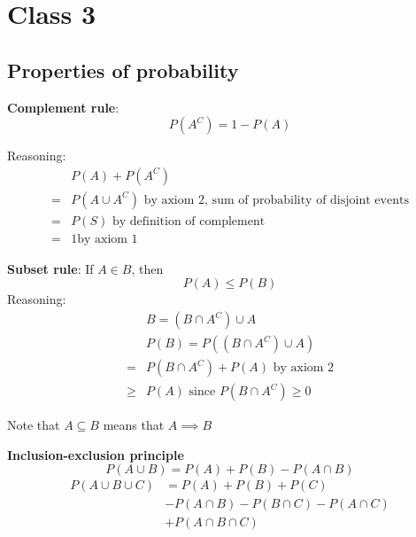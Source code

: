 \chapter{Class 3}

\section{Properties of probability}

\begin{framed}
   \textbf{Complement rule}: 
   \[
     P(A^C) = 1 - P(A)
   \] 

   Reasoning:
   \begin{align*}
      &P(A) + P(A^C) \\
      =& P(A \cup A^C) \text{ by axiom 2, sum of probability of disjoint events} \\
      =& P(S) \text{ by definition of complement} \\
      =& 1 \text{by axiom 1}
   \end{align*}
\end{framed}

\begin{framed}
   \textbf{Subset rule}: If $A \in B$, then
   \[
     P(A) \leq P(B)
   \] 
   Reasoning: 
   \begin{align*}
      & B = (B \cap A^C) \cup A \\
      &P(B) = P((B \cap A^C) \cup A) \\
      =& P(B \cap A^C) + P(A) \text{ by axiom 2} \\
      \geq& P(A) \text{ since $P(B \cap A^C) \geq 0$}
   \end{align*}
   
Note that $A \subseteq B$ means that $A \implies B$
\end{framed}

\begin{framed}
\textbf{Inclusion-exclusion principle}
\[
  P(A \cup B) = P(A) + P(B) - P(A \cap B)
\] 
\begin{align*}
   P(A \cup B \cup C) &= P(A) + P(B) + P(C)  \\
                      & - P(A \cap B) - P(B \cap C) - P(A \cap C) \\
                      &+ P(A \cap B \cap C)
\end{align*}
\end{framed}

